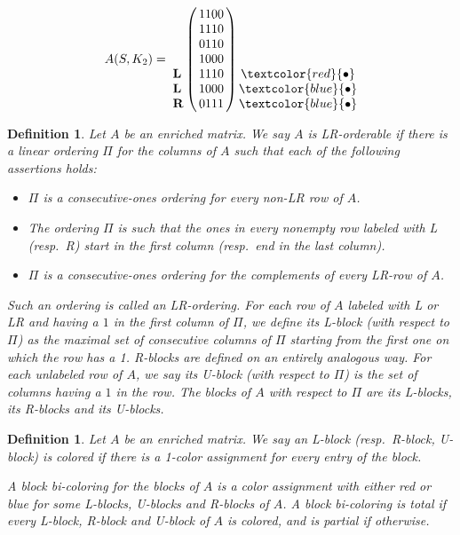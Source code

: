 \documentclass[12pt]{book}
\theoremstyle{plain}
\newtheorem{defn}[teo]{Definition}
\theoremstyle{remark}
\begin{document}
\vspace{-5mm}
\[
A(S,K_2) = 
\bordermatrix{ &  \cr
	& 1 1 0 0 \cr
	& 1 1 1 0 \cr
	& 0 1 1 0 \cr
	& 1 0 0 0 \cr
	\textbf{L} & 1 1 1 0 \cr
	\textbf{L} & 1 0 0 0 \cr
	\textbf{R} & 0 1 1 1 }\,
	\begin{matrix} 
   \cr  \cr \cr  \cr \textcolor{red}{\bullet} \cr \textcolor{blue}{\bullet} \cr \textcolor{blue}{\bullet} 
\end{matrix}
\]
\vspace{.5mm}
\begin{defn} \label{def:LR-orderable}
	Let $A$ be an enriched matrix. We say $A$ is \emph{LR-orderable} if there is a linear ordering $\Pi$ for the columns of $A$ such that each of the following assertions holds:
	\begin{itemize}
	    \item $\Pi$ is a consecutive-ones ordering for every non-LR row of $A$.
	    
		\item The ordering $\Pi$ is such that the ones in every nonempty row labeled with L (resp.\ R) start in the first column (resp.\ end in the last column). %
		
		\item $\Pi$ is a consecutive-ones ordering for the complements of every LR-row of $A$.
     \end{itemize} 
Such an ordering is called an \emph{LR-ordering}.
For each row of $A$ labeled with L or LR and having a $1$ in the first column of $\Pi$, we define its \emph{L-block (with respect to $\Pi$)} as the maximal set of consecutive columns of $\Pi$ starting from the first one on which the row has a 1. \emph{R-blocks} are defined on an entirely analogous way.
For each unlabeled row of $A$, we say its \emph{U-block (with respect to $\Pi$)} is the set of columns having a $1$ in the row.
The blocks of $A$ with respect to $\Pi$ are its L-blocks, its R-blocks and its U-blocks. 
\end{defn} 

\begin{defn} \label{def:block-bicoloring}
	Let $A$ be an enriched matrix. We say an \emph{L-block (resp.\ R-block, U-block) is colored} if there is a 1-color assignment for every entry of the block. %
	
	A \emph{block bi-coloring for the blocks of $A$} is a color assignment with either red or blue for some L-blocks, U-blocks and R-blocks of $A$.
		A block bi-coloring is \emph{total }if every L-block, R-block and U-block of $A$ is colored, and is \emph{partial }if otherwise.
\end{defn}
\end{document}
